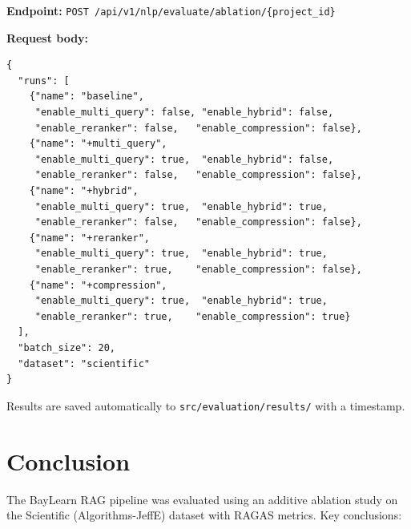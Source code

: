 \documentclass[12pt,a4paper]{article}
\begin{document}
\textbf{Endpoint:} \texttt{POST /api/v1/nlp/evaluate/ablation/\{project\_id\}}

\textbf{Request body:}
\begin{verbatim}
{
  "runs": [
    {"name": "baseline",
     "enable_multi_query": false, "enable_hybrid": false,
     "enable_reranker": false,   "enable_compression": false},
    {"name": "+multi_query",
     "enable_multi_query": true,  "enable_hybrid": false,
     "enable_reranker": false,   "enable_compression": false},
    {"name": "+hybrid",
     "enable_multi_query": true,  "enable_hybrid": true,
     "enable_reranker": false,   "enable_compression": false},
    {"name": "+reranker",
     "enable_multi_query": true,  "enable_hybrid": true,
     "enable_reranker": true,    "enable_compression": false},
    {"name": "+compression",
     "enable_multi_query": true,  "enable_hybrid": true,
     "enable_reranker": true,    "enable_compression": true}
  ],
  "batch_size": 20,
  "dataset": "scientific"
}
\end{verbatim}

Results are saved automatically to \texttt{src/evaluation/results/} with a timestamp.

\section{Conclusion}

The BayLearn RAG pipeline was evaluated using an additive ablation study on the Scientific
(Algorithms-JeffE) dataset with RAGAS metrics. Key conclusions:
\end{document}
